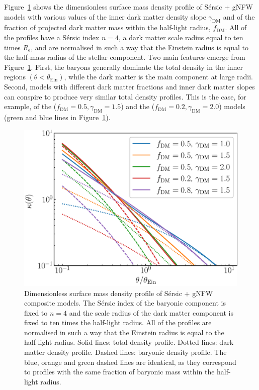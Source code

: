 \documentclass{aa}
\def\reff{R_{\mathrm{e}}}
\def\gammadm{\gamma_{\mathrm{DM}}}
\def\fdm{f_{\mathrm{DM}}}
\def\tein{\theta_{\mathrm{Ein}}}
\def\Fref#1{Figure~\ref{#1}\xspace}
\begin{document}
\Fref{fig:kappa} shows the dimensionless surface mass density profile of S\'{e}rsic + gNFW models with various values of the inner dark matter density slope $\gammadm$ and of the fraction of projected dark matter mass within the half-light radius, $\fdm$.
All of the profiles have a S\'{e}rsic index $n=4$, a dark matter scale radius equal to ten times $\reff$, and are normalised in such a way that the Einstein radius is equal to the half-mass radius of the stellar component. 
Two main features emerge from \Fref{fig:kappa}. First, the baryons generally dominate the total density in the inner regions $(\theta < \tein)$, while the dark matter is the main component at large radii.
Second, models with different dark matter fractions and inner dark matter slopes can conspire to produce very similar total density profiles. 
This is the case, for example, of the ($\fdm=0.5,\gammadm=1.5$) and the ($\fdm=0.2,\gammadm=2.0$) models (green and blue lines in \Fref{fig:kappa}).

%
\begin{figure}
\includegraphics[width=\columnwidth]{composite_fixedap_kappa.eps}
\caption{
Dimensionless surface mass density profile of S\'{e}rsic + gNFW composite models.
The S\'{e}rsic index of the baryonic component is fixed to $n=4$ and the scale radius of the dark matter component is fixed to ten times the half-light radius.
All of the profiles are normalised in such a way that the Einstein radius is equal to the half-light radius.
Solid lines: total density profile. Dotted lines: dark matter density profile. Dashed lines: baryonic density profile.
The blue, orange and green dashed lines are identical, as they correspond to profiles with the same fraction of baryonic mass within the half-light radius.
\label{fig:kappa}
}
\end{figure}
%
\end{document}
